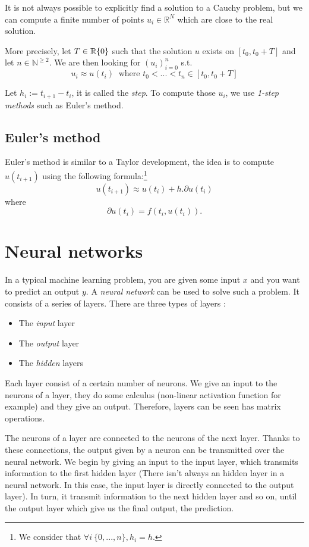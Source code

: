 \documentclass[10pt,a4paper]{article}
\theoremstyle{definition}
\theoremstyle{theorem}
\begin{document}
It is not always possible to explicitly find a solution to a Cauchy problem, but we can compute a finite number of points $u_i \in \mathbb{R}^N$ which are close to the real solution. 

More precisely, let $T \in \mathbb{R}\\\{0\}$ such that the solution $u$ exists on $[t_0, t_0 + T]$ and let $n \in \mathbb{N}^{\geqslant 2}$. We are then looking for $(u_i)^n_{i=0}$ s.t. 
\[
u_i \approx u(t_i) \ \text{ where } t_0 < ... < t_n \in [t_0, t_0 + T]
\]

Let $h_i := t_{i+1} - t_i$, it is called the \textit{step}. To compute those $u_i$, we use \textit{1-step methods} such as Euler's method.

\subsection{Euler's method}

Euler's method is similar to a Taylor development, the idea is to compute $u(t_{i+1})$ using the following formula:\footnote{We consider that $ \forall i\ \{0,...,n\}, h_i = h$.}
\[
u(t_{i+1}) \approx u(t_i) + h . \partial u(t_i)
\]
where 
\[
\partial u(t_i) = f(t_i, u(t_i)).
\]

\section{Neural networks}

In a typical machine learning problem, you are given some input $x$ and you want to predict an output $y$. A \textit{neural network} can be used to solve such a problem. It consists of a series of layers. There are three types of layers :

\begin{itemize}
\item The \textit{input} layer
\item The \textit{output} layer
\item The \textit{hidden} layers
\end{itemize}

Each layer consist of a certain number of neurons. We give an input to the neurons of a layer, they do some calculus (non-linear activation function for example) and they give an output. Therefore, layers can be seen has matrix operations. 

The neurons of a layer are connected to the neurons of the next layer. Thanks to these connections, the output given by a neuron can be transmitted over the neural network. We begin by giving an input to the input layer, which transmits information to the first hidden layer (There isn't always an hidden layer in a neural network. In this case, the input layer is directly connected to the output layer). In turn, it transmit information to the next hidden layer and so on, until the output layer which give us the final output, the prediction. 
\end{document}
